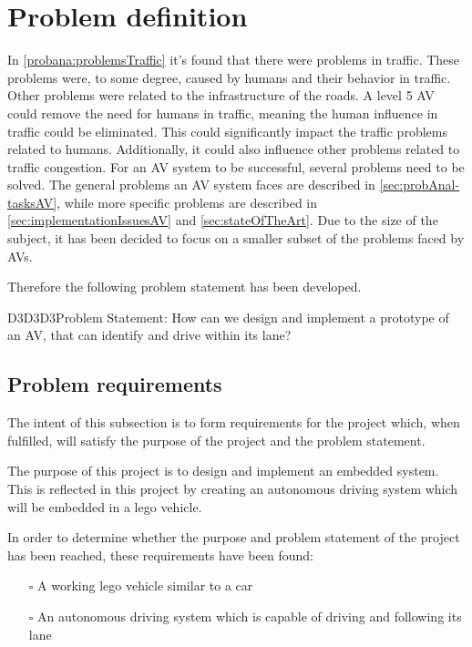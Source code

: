 \section{Problem definition}\label{sec:problem-statement}
In \autoref{probana:problemsTraffic} it's found that there were problems in traffic.
These problems were, to some degree, caused by humans and their behavior in traffic.
Other problems were related to the infrastructure of the roads.
A level 5 AV could remove the need for humans in traffic, meaning the human influence in traffic could be eliminated.
This could significantly impact the traffic problems related to humans.
Additionally, it could also influence other problems related to traffic congestion.
For an AV system to be successful, several problems need to be solved.
The general problems an AV system faces are described in \autoref{sec:probAnal-tasksAV}, while more specific problems are described in \autoref{sec:implementationIssuesAV} and \autoref{sec:stateOfTheArt}.
Due to the size of the subject, it has been decided to focus on a smaller subset of the problems faced by AVs.



Therefore the following problem statement has been developed.

\begin{colbox}{D3D3D3}{Problem Statement:}
    {How can we design and implement a prototype of an AV, that can identify and drive within its lane?}
\end{colbox}

\subsection{Problem requirements}\label{ssec:problemRequirements}
The intent of this subsection is to form requirements for the project which, when fulfilled, will satisfy the purpose of the project and the problem statement.

The purpose of this project is to design and implement an embedded system.
This is reflected in this project by creating an autonomous driving system which will be embedded in a lego vehicle.

In order to determine whether the purpose and problem statement of the project has been reached, these requirements have been found:
\begin{itemize}
    \item[$\square$] A working lego vehicle similar to a car
    \item[$\square$] An autonomous driving system which is capable of driving and following its lane
\end{itemize}

